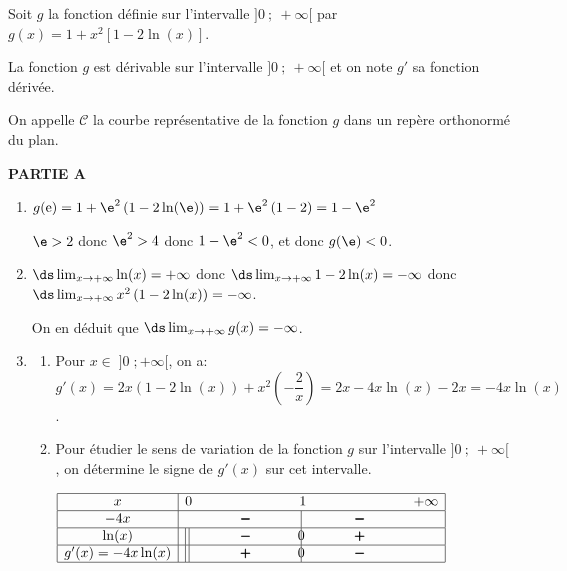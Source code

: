 \medskip

Soit $g$ la fonction définie sur l'intervalle $]0~;~+\infty[$ par 
$g(x) = 1+ x^2[1 - 2 \ln (x)].$

La fonction $g$ est dérivable sur l'intervalle $]0~;~+\infty[$ et on note $g'$ sa fonction dérivée.

On appelle $\mathcal{C}$ la courbe représentative de la fonction $g$ dans un repère orthonormé du plan.

\medskip

\textbf{PARTIE A}



\begin{enumerate}
\item $g(\text{e}) = 1+\e^2\left (1-2\ln(\e)\right ) = 1+\e^2\left (1-2\right ) 
=1-\e^2$

$\e>2$ donc $\e^2>4$ donc $1-\e^2<0$, et donc $g(\e)<0$.

\item 
$\ds\lim_{x \to +\infty} \ln(x)=+\infty$ donc $\ds\lim_{x \to +\infty} 1-2\ln(x) = -\infty$ donc $\ds\lim_{x \to +\infty} x^2\left (1-2\ln(x)\right )=-\infty$.

On en déduit que $\ds\lim_{x \to + \infty} g(x) = - \infty$.

\item 
	\begin{enumerate}
		\item 
Pour $x\in\;]0\;; +\infty[$, on a:	\\
$g'(x)=2x\left (1-2\ln(x)\right ) + x^2\left (-\dfrac{2}{x}\right )
= 2x -4x\ln(x) -2x=-4x\ln(x)$.	
		
		\item Pour étudier le sens de variation de la fonction $g$ sur l'intervalle $]0~;~+\infty[$, on détermine le signe de $g'(x)$ sur cet intervalle.
		
\begin{center}
{\renewcommand{\arraystretch}{1.5}
\def\esp{\hspace*{2cm}}
$\begin{array}{|c | l*{4}{c} |} 
\hline
x  & 0 & \esp & 1 & \esp  & +\infty \\
\hline
-4x &  & \pmb{-} &  \vline\hspace{-2.7pt}{\phantom 0} & \pmb{-} &   \\
\hline
\ln(x) &\vline\:\vline  & \pmb{-} &  \vline\hspace{-2.7pt}{0} & \pmb{+} &   \\
\hline
g'(x)=-4x\ln(x) & \vline\:\vline & \pmb{+} &  \vline\hspace{-2.7pt}{0} & \pmb{-} &   \\
\hline
\end{array}$
}
\end{center}
		

\end{enumerate}
\end{enumerate}
